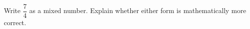 Write $\dfrac{7}{4}$ as a mixed number. Explain whether either form is mathematically more correct.
